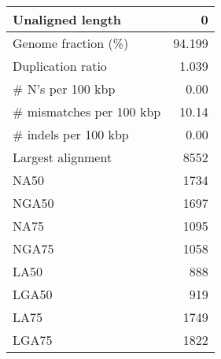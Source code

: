 \documentclass[12pt,a4paper]{article}
\begin{document}
\begin{table}[ht]
\begin{center}
\begin{tabular}{|l*{1}{|r}|}
Unaligned length & 0 \\ \hline
Genome fraction (\%) & 94.199 \\ \hline
Duplication ratio & 1.039 \\ \hline
\# N's per 100 kbp & 0.00 \\ \hline
\# mismatches per 100 kbp & 10.14 \\ \hline
\# indels per 100 kbp & 0.00 \\ \hline
Largest alignment & 8552 \\ \hline
NA50 & 1734 \\ \hline
NGA50 & 1697 \\ \hline
NA75 & 1095 \\ \hline
NGA75 & 1058 \\ \hline
LA50 & 888 \\ \hline
LGA50 & 919 \\ \hline
LA75 & 1749 \\ \hline
LGA75 & 1822 \\ \hline
\end{tabular}
\end{center}
\end{table}
\end{document}

